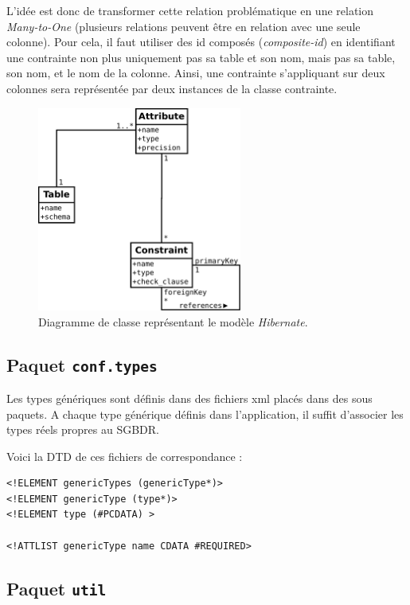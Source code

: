 L'idée est donc de transformer cette relation problématique en une relation \emph{Many-to-One} (plusieurs relations peuvent être en relation avec une seule colonne). Pour cela, il faut utiliser des id composés (\emph{composite-id}) en identifiant une contrainte non plus uniquement pas sa table et son nom, mais pas sa table, son nom, et le nom de la colonne. Ainsi, une contrainte s'appliquant sur deux colonnes sera représentée par deux instances de la classe contrainte.

\begin{figure}[H]
\includegraphics[width=0.6\textwidth]{files/diag_class_final}
\centering
\caption{Diagramme de classe représentant le modèle \emph{Hibernate}.}
\label{figure:diag_class_model_hibernate}
\end{figure}

\subsection{Paquet \texttt{conf.types}}
\label{subsection:conf.types}

Les types génériques sont définis dans des fichiers xml placés dans des sous paquets. A chaque type générique définis dans l'application, il suffit d'associer les types réels propres au SGBDR. 

Voici la DTD de ces fichiers de correspondance : 
\begin{verbatim}
<!ELEMENT genericTypes (genericType*)>
<!ELEMENT genericType (type*)>
<!ELEMENT type (#PCDATA) >

<!ATTLIST genericType name CDATA #REQUIRED>
\end{verbatim}


\subsection{Paquet \texttt{util}}
\label{subsection:util}

